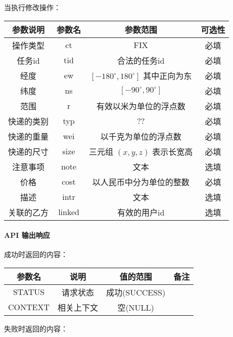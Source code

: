 \documentclass[UTF8]{article}
\def\apiresp{\paragraph{\colorbox[rgb]{0.78,0.7,0.65}{API 输出响应}}} %
\def\失败{\colorbox[rgb]{1,0.5,0.5}{失败}}
\def\成功{\colorbox[rgb]{0.4,1,0.5}{成功}}
\def\成功V{成功(SUCCESS)}
\def\失败V{失败(FAILED)}
\def\失败原因{失败原因(失败代码，大写字母与数字)}
\def\空{空(NULL)}
\begin{document}
    \par 当执行修改操作： \\
    \begin{tabular}{|c|c|c|c|}
        \hline \rule[-2ex]{0pt}{5.5ex} 参数说明 & 参数名 & 参数范围 & 可选性 \\
        \hline \rule[-2ex]{0pt}{5.5ex} 操作类型 & ct & FIX & 必填 \\
        \hline \rule[-2ex]{0pt}{5.5ex} 任务id & tid & 合法的任务id & 必填 \\
        \hline \rule[-2ex]{0pt}{5.5ex} 经度 & ew & $[-180^\circ,180^\circ]$ 其中正向为东 & 必填 \\
        \hline \rule[-2ex]{0pt}{5.5ex} 纬度 & ns & $[-90^\circ,90^\circ]$ & 必填 \\
        \hline \rule[-2ex]{0pt}{5.5ex} 范围 & r & 有效以米为单位的浮点数 & 必填 \\
        \hline \rule[-2ex]{0pt}{5.5ex} 快递的类别 & typ & ?? & 必填 \\
        \hline \rule[-2ex]{0pt}{5.5ex} 快递的重量 & wei & 以千克为单位的浮点数 & 必填 \\
        \hline \rule[-2ex]{0pt}{5.5ex} 快递的尺寸 & size & 三元组 $(x,y,z)$ 表示长宽高 & 必填 \\
        \hline \rule[-2ex]{0pt}{5.5ex} 注意事项 & note & 文本 & 选填 \\
        \hline \rule[-2ex]{0pt}{5.5ex} 价格 & cost & 以人民币中分为单位的整数 & 必填 \\
        \hline \rule[-2ex]{0pt}{5.5ex} 描述 & intr & 文本 & 选填 \\
        \hline \rule[-2ex]{0pt}{5.5ex} 关联的乙方 & linked & 有效的用户id & 选填 \\
        \hline 
    \end{tabular} 
    \apiresp
    \成功 时返回的内容：\\
    \begin{tabular}{|c|c|c|c|}
        \hline \rule[-2ex]{0pt}{5.5ex} 参数名 & 说明 & 值的范围 & 备注 \\
        \hline \rule[-2ex]{0pt}{5.5ex} STATUS & 请求状态 & \成功V &  \\ 
        \hline \rule[-2ex]{0pt}{5.5ex} CONTEXT & 相关上下文 & \空 &  \\
        \hline 
    \end{tabular} 
    \par \失败 时返回的内容：\\
\end{document}
